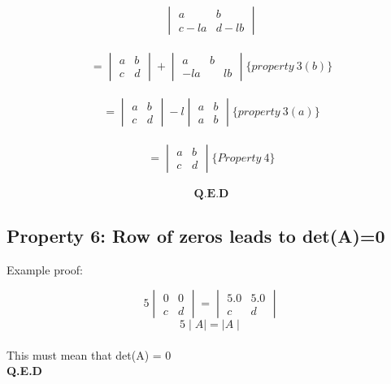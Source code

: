 \documentclass[]{article}
\begin{document}
\[
\begin{vmatrix}
	a&b\\
	c-la&d-lb
\end{vmatrix}
\]\\

\[
= \begin{vmatrix}
	a&b\\
	c&d
\end{vmatrix}+ \begin{vmatrix}
a&b\\
-la&&lb
\end{vmatrix}\{property \ 3(b)\}
\]\\

\[
=\begin{vmatrix}
	a&b\\
	c&d
\end{vmatrix}-l \begin{vmatrix}
a&b\\
a&b
\end{vmatrix}\{ property \ 3(a)\}
\]\\

\[
=\begin{vmatrix}
	a&b\\
	c&d
\end{vmatrix} \{ Property \ 4\}
\]\\

\[
\textbf{Q.E.D}
\]

\vspace{10pt}

\subsection{Property 6: Row of zeros leads to det(A)=0}

\vspace{10pt}

\noindent
Example proof:

\[
5\begin{vmatrix}
	0&0\\
	c&d
\end{vmatrix}=\begin{vmatrix}
5.0&5.0\\
c&d
\end{vmatrix}
\]
\[
5 \mid A \mid = \mid A \mid
\]\\

This must mean that det(A) = 0\\

\textbf{Q.E.D}

\vspace{10pt}
\end{document}
